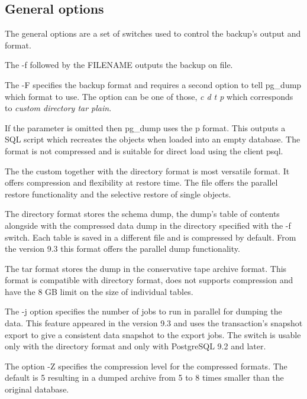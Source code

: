 \subsection{General options}
The general options are a set of switches used to control the backup's output and format. 

The -f followed by the FILENAME outputs the backup on file.\newline

The  -F specifies the backup format and requires a second 
option to tell pg\_dump which format to 
use. The option can be one of those, \textit{c d t p} which corresponds to 
\textit{custom directory tar plain}.\newline

If the parameter is omitted then pg\_dump uses the p format. This outputs a SQL script which 
recreates the objects when loaded into an empty database. The format is not compressed and is 
suitable for direct load using the client psql. 

The the custom together with the directory format is most versatile format. It offers compression 
and flexibility at restore time. The file offers the parallel restore functionality and the 
selective restore of single objects.\newline

The directory format stores the schema dump, the dump's table of contents alongside with the 
compressed data dump in the directory specified with the -f switch. Each table is saved in a 
different file and is compressed by default. From the version 9.3 this format offers the parallel 
dump functionality. \newline

The tar format stores the dump in the conservative tape archive format. This format is compatible 
with directory format, does not supports compression and have the 8 GB limit on the size of 
individual tables.\newline

The -j option specifies the number of jobs to run in parallel for dumping the data. This feature 
appeared in the version 9.3 and uses the transaction's snapshot export to give a consistent data 
snapshot to the export jobs. The switch is usable only with the directory format and only 
with PostgreSQL 9.2 and later.\newline 

The option -Z specifies the compression level for the compressed formats. The default is 5 
resulting in a dumped archive from 5 to 8 times smaller than the original database. 

